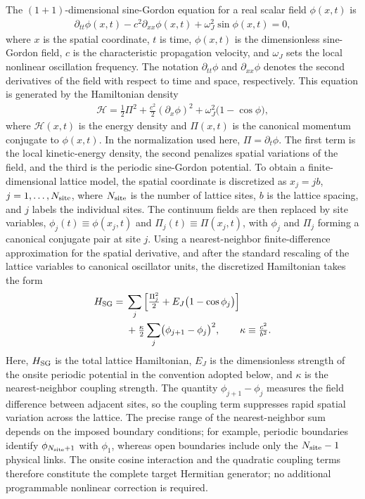 \documentclass[pra,twocolumn,superscriptaddress,nofootinbib,floatfix]{revtex4-2}
\theoremstyle{remark}
\begin{document}
The $(1+1)$-dimensional sine-Gordon equation for a real scalar field $\phi(x,t)$ is
\begin{align}
\partial_{tt}\phi(x,t) - c^2\partial_{xx}\phi(x,t) + \omega_J^2\sin\phi(x,t) = 0,
\label{eq:sinegordon}
\end{align}
where $x$ is the spatial coordinate, $t$ is time, $\phi(x,t)$ is the dimensionless sine-Gordon field, $c$ is the characteristic propagation velocity, and $\omega_J$ sets the local nonlinear oscillation frequency. The notation $\partial_{tt}\phi$ and $\partial_{xx}\phi$ denotes the second derivatives of the field with respect to time and space, respectively.
This equation is generated by the Hamiltonian density
\begin{align}
\mathcal H =\tfrac12\Pi^2+ \tfrac{c^2}{2}(\partial_x\phi)^2+ \omega_J^2\bigl(1-\cos\phi\bigr),
\label{eq:sg-density}
\end{align}
where $\mathcal H(x,t)$ is the energy density and $\Pi(x,t)$ is the canonical momentum conjugate to $\phi(x,t)$. In the normalization used here, $\Pi=\partial_t\phi$. The first term is the local kinetic-energy density, the second penalizes spatial variations of the field, and the third is the periodic sine-Gordon potential. To obtain a finite-dimensional lattice model, the spatial coordinate is discretized as \(x_j=jb\), \(j=1,\ldots,N_{\rm site}\), where $N_{\rm site}$ is the number of lattice sites, $b$ is the lattice spacing, and $j$ labels the individual sites. The continuum fields are then replaced by site variables, \(\phi_j(t)\equiv \phi(x_j,t)\) and \(\Pi_j(t)\equiv \Pi(x_j,t)\), with $\phi_j$ and $\Pi_j$ forming a canonical conjugate pair at site $j$. Using a nearest-neighbor finite-difference approximation for the spatial derivative, and after the standard rescaling of the lattice variables to canonical oscillator units, the discretized Hamiltonian takes the form
\begin{align}
H_{\rm SG} ={}&\sum_{j} \left[ \tfrac{\Pi_j^2}{2} + E_J\bigl(1-\cos\phi_j\bigr) \right]\nonumber\\
&+ \tfrac{\kappa}{2}\sum_{j}\bigl(\phi_{j+1}-\phi_j\bigr)^2,\qquad\kappa \equiv \tfrac{c^2}{b^2}.
\label{eq:sg-lattice}
\end{align}
Here, $H_{\rm SG}$ is the total lattice Hamiltonian, $E_J$ is the dimensionless strength of the onsite periodic potential in the convention adopted below, and $\kappa$ is the nearest-neighbor coupling strength. The quantity $\phi_{j+1}-\phi_j$ measures the field difference between adjacent sites, so the coupling term suppresses rapid spatial variation across the lattice. The precise range of the nearest-neighbor sum depends on the imposed boundary conditions; for example, periodic boundaries identify $\phi_{N_{\rm site}+1}$ with $\phi_1$, whereas open boundaries include only the $N_{\rm site}-1$ physical links. The onsite cosine interaction and the quadratic coupling terms therefore constitute the complete target Hermitian generator; no additional programmable nonlinear correction is required.
\end{document}
